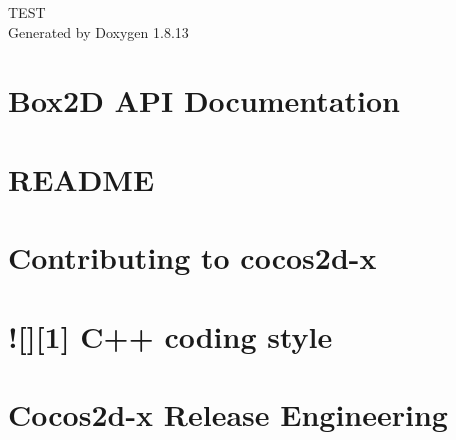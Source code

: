 \documentclass[twoside]{book}
\newcommand{\+}{\discretionary{\mbox{\scriptsize$\hookleftarrow$}}{}{}}
\newcommand{\clearemptydoublepage}{%
  \newpage{\pagestyle{empty}\cleardoublepage}%
}
\begin{document}
\hypersetup{pageanchor=false,
             bookmarksnumbered=true,
             pdfencoding=unicode
            }
\begin{titlepage}
\vspace*{7cm}
\begin{center}%
{\Large T\+E\+ST }\\
\vspace*{1cm}
{\large Generated by Doxygen 1.8.13}\\
\end{center}
\end{titlepage}
\clearemptydoublepage
{}
\tableofcontents
\clearemptydoublepage
{}
\hypersetup{pageanchor=true}

\chapter{Box2D A\+PI Documentation}
\label{index}\hypertarget{index}{}
\chapter{R\+E\+A\+D\+ME}
\label{md__home_pmx_git_PMX_README}

\chapter{Contributing to cocos2d-\/x}
\label{md__home_pmx_git_PMX_SimuCocos_cocos2d_CONTRIBUTING}

\chapter{!\mbox{[}\mbox{]}\mbox{[}1\mbox{]} C++ coding style}
\label{md__home_pmx_git_PMX_SimuCocos_cocos2d_docs_CODING_STYLE}

\chapter{Cocos2d-\/x Release Engineering}
\label{md__home_pmx_git_PMX_SimuCocos_cocos2d_docs_RELEASE_ENGINEERING}

\end{document}

